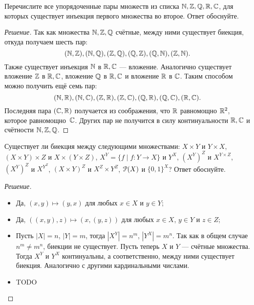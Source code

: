     \begin{problem}[3]
        Перечислите все упорядоченные пары множеств из списка \(\mathbb{N}, \mathbb{Z}, \mathbb{Q}, \mathbb{R}, \mathbb{C}\), для которых существует инъекция первого множества во второе. Ответ обоснуйте.
    \end{problem}
    \begin{proof}[Решение]
        Так как множества \(\mathbb{N}, \mathbb{Z}, \mathbb{Q}\) счётные, между ними существует биекция, откуда получаем шесть пар: \[
            (\mathbb{N}, \mathbb{Z}), (\mathbb{N}, \mathbb{Q}), (\mathbb{Z}, \mathbb{Q}), (\mathbb{Q}, \mathbb{Z}), (\mathbb{Q}, \mathbb{N}), (\mathbb{Z}, \mathbb{N}).    
        \]
        Также существует инъекция \(\mathbb{N}\) в \(\mathbb{R}, \mathbb{C}\) --- вложение. Аналогично существует вложение \(\mathbb{Z}\) в \(\mathbb{R}, \mathbb{C}\), вложение \(\mathbb{Q}\) в \(\mathbb{R}, \mathbb{C}\) и вложение \(\mathbb{R}\) в \(\mathbb{C}\). Таким способом можно получить ещё семь пар: \[
            (\mathbb{N}, \mathbb{R}), (\mathbb{N}, \mathbb{C}), (\mathbb{Z}, \mathbb{R}), (\mathbb{Z}, \mathbb{C}), (\mathbb{Q}, \mathbb{R}), (\mathbb{Q}, \mathbb{C}), (\mathbb{R}, \mathbb{C}).
        \]
        Последняя пара \((\mathbb{C}, \mathbb{R})\) получается из соображения, что \(\mathbb{R}\) равномощно \(\mathbb{R}^2\), которое равномощно~\(\mathbb{C}\). Других пар не получится в силу континуальности \(\mathbb{R}, \mathbb{C}\) и счётности \(\mathbb{N}, \mathbb{Z}, \mathbb{Q}\).
    \end{proof}

    \begin{problem}[4]
        Существует ли биекция между следующими множествами: \(X \times Y\) и \(Y \times X\), \((X \times Y) \times Z\) и \(X \times (Y \times Z)\), \(X^Y = \{f \mid f \colon Y \to X\}\) и \(Y^X\), \((X^Y)^Z\) и \(X^{Y \times Z}\), \((X^Y)^Z\) и \(X^{Y^Z}\), \((X \times Y)^Z\) и \(X^Z \times Y^Z\), \(\operatorname{\mathcal{P}}(X)\) и  \(\{0, 1\}^X\)? Ответ обоснуйте. 
    \end{problem}
    \begin{proof}[Решение]
        \begin{itemize}
            \item Да, \((x, y) \mapsto (y, x)\) для любых \(x \in X\) и \(y \in Y\);
            \item Да, \(((x, y), z) \mapsto (x, (y, z))\) для любых \(x \in X\), \(y \in Y\) и \(z \in Z\);
            \item Пусть \(|X| = n\), \(|Y| = m\), тогда \(|X^Y| = n^m\), \(|Y^X| = m^n\). Так как в общем случае \(n^m \neq m^n\), биекции не существует. Пусть теперь \(X\) и \(Y\) --- счётные множества. Тогда \(X^Y\) и \(Y^X\) континуальны, а соответственно, между ними существует биекция. Аналогично с другими кардинальными числами.
            \item TODO
        \end{itemize}
    \end{proof}

